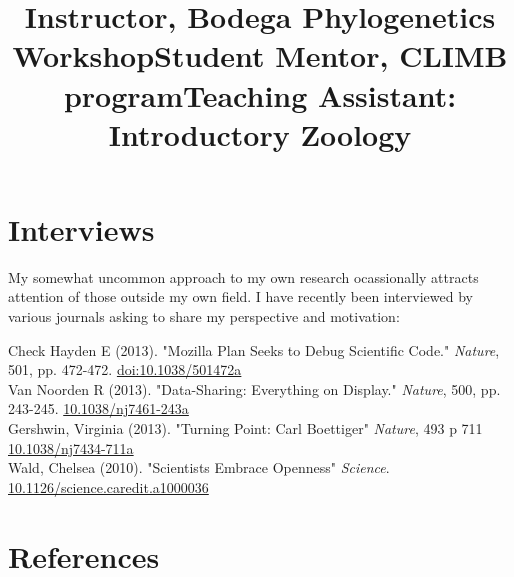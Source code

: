 \documentclass[margin]{res}
\begin{document}
\begin{resume}
\title{Instructor, Bodega Phylogenetics Workshop}
\begin{position}
  \vspace{-.5cm}
\end{position}


\title{Student Mentor, CLIMB program}
\begin{position}
  \vspace{-.5cm}
\end{position}

\title{Teaching Assistant: Introductory Zoology}
\begin{position}
  \vspace{-.5cm}
\end{position}




\section{Interviews}

My somewhat uncommon approach to my own research ocassionally attracts attention of those outside my own field.  I have recently been interviewed by various journals asking to share my perspective and motivation:  


Check Hayden E (2013). "Mozilla Plan Seeks to Debug Scientific Code." \emph{Nature}, 501, pp. 472-472. \href{http://doi.org/10.1038/501472a}{doi:10.1038/501472a} \\
Van Noorden R (2013). "Data-Sharing: Everything on Display." \emph{Nature}, 500, pp. 243-245. \href{http://doi.org/10.1038/nj7461-243a}{10.1038/nj7461-243a} \\
Gershwin, Virginia (2013). "Turning Point: Carl Boettiger" \emph{Nature}, 493 p 711 \href{http://doi.org/10.1038/nj7434-711a}{10.1038/nj7434-711a} \\ 
Wald, Chelsea (2010). "Scientists Embrace Openness" \emph{Science}. \href{http://doi.org/10.1126/science.caredit.a1000036}{10.1126/science.caredit.a1000036} 



\section{References}


\end{resume}
\end{document}
